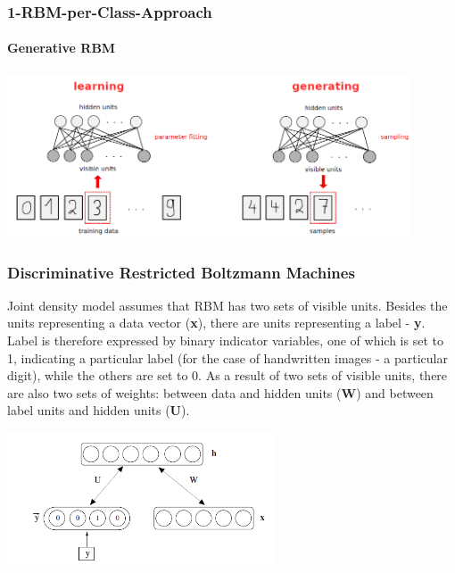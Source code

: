 \documentclass[a4paper]{scrartcl}
\begin{document}
\subsubsection{1-RBM-per-Class-Approach}
\paragraph{Generative RBM}
\begin{center}
\includegraphics[width=12cm]{images/generativeRBM.png}
\end{center}
\subsubsection{Discriminative Restricted Boltzmann Machines}
Joint density model assumes that RBM has two sets of visible units. Besides the units representing a data vector ({\bfseries x}), there are units representing a label - {\bfseries y}. Label is therefore expressed by binary indicator variables, one of which is set to 1, indicating a particular label (for the case of handwritten images - a particular digit), while the others are set to 0. 
As a result of two sets of visible units, there are also two sets of weights: between data and hidden units ({\bfseries W}) and between label units and hidden units ({\bfseries U}). 
\begin{center}
\includegraphics[width=8cm]{images/jointProbModel2.png}
\end{center}
\end{document}
